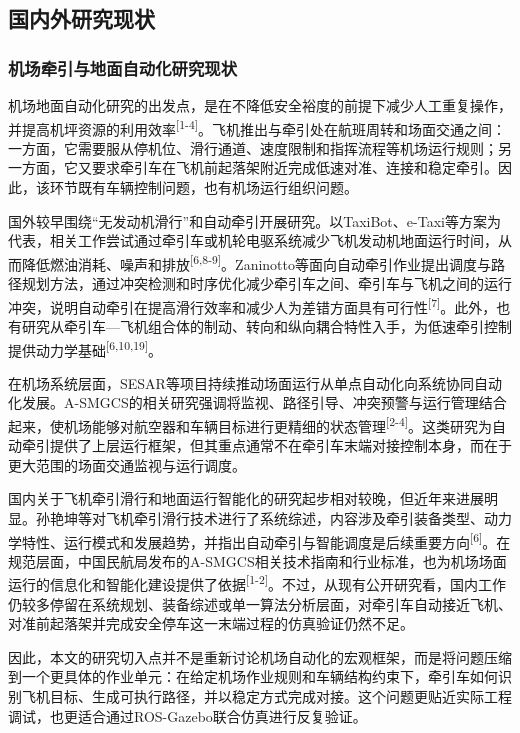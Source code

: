 \subsection{国内外研究现状}

\subsubsection{机场牵引与地面自动化研究现状}

机场地面自动化研究的出发点，是在不降低安全裕度的前提下减少人工重复操作，并提高机坪资源的利用效率\textsuperscript{[1-4]}。飞机推出与牵引处在航班周转和场面交通之间：一方面，它需要服从停机位、滑行通道、速度限制和指挥流程等机场运行规则；另一方面，它又要求牵引车在飞机前起落架附近完成低速对准、连接和稳定牵引。因此，该环节既有车辆控制问题，也有机场运行组织问题。

国外较早围绕``无发动机滑行''和自动牵引开展研究。以TaxiBot、e-Taxi等方案为代表，相关工作尝试通过牵引车或机轮电驱系统减少飞机发动机地面运行时间，从而降低燃油消耗、噪声和排放\textsuperscript{[6,8-9]}。Zaninotto等面向自动牵引作业提出调度与路径规划方法，通过冲突检测和时序优化减少牵引车之间、牵引车与飞机之间的运行冲突，说明自动牵引在提高滑行效率和减少人为差错方面具有可行性\textsuperscript{[7]}。此外，也有研究从牵引车---飞机组合体的制动、转向和纵向耦合特性入手，为低速牵引控制提供动力学基础\textsuperscript{[6,10,19]}。

在机场系统层面，SESAR等项目持续推动场面运行从单点自动化向系统协同自动化发展。A-SMGCS的相关研究强调将监视、路径引导、冲突预警与运行管理结合起来，使机场能够对航空器和车辆目标进行更精细的状态管理\textsuperscript{[2-4]}。这类研究为自动牵引提供了上层运行框架，但其重点通常不在牵引车末端对接控制本身，而在于更大范围的场面交通监视与运行调度。

国内关于飞机牵引滑行和地面运行智能化的研究起步相对较晚，但近年来进展明显。孙艳坤等对飞机牵引滑行技术进行了系统综述，内容涉及牵引装备类型、动力学特性、运行模式和发展趋势，并指出自动牵引与智能调度是后续重要方向\textsuperscript{[6]}。在规范层面，中国民航局发布的A-SMGCS相关技术指南和行业标准，也为机场场面运行的信息化和智能化建设提供了依据\textsuperscript{[1-2]}。不过，从现有公开研究看，国内工作仍较多停留在系统规划、装备综述或单一算法分析层面，对牵引车自动接近飞机、对准前起落架并完成安全停车这一末端过程的仿真验证仍然不足。

因此，本文的研究切入点并不是重新讨论机场自动化的宏观框架，而是将问题压缩到一个更具体的作业单元：在给定机场作业规则和车辆结构约束下，牵引车如何识别飞机目标、生成可执行路径，并以稳定方式完成对接。这个问题更贴近实际工程调试，也更适合通过ROS-Gazebo联合仿真进行反复验证。


